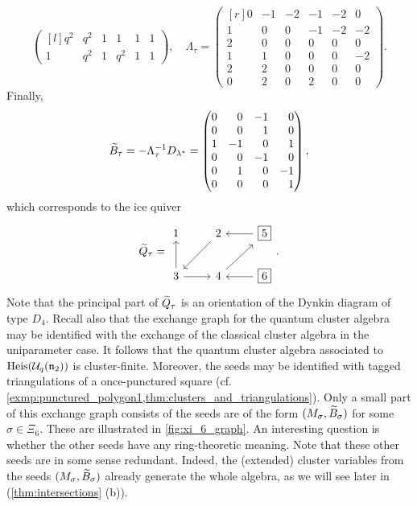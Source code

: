 \begin{example}
\begin{equation}
\begin{pmatrix*}[l]
			q^{2} & q^{2}    & 1        & 1        & 1        & 1        \\
			1     & q^{2}    & 1        & q^{2}    & 1        & 1
		\end{pmatrix*}
		,\quad
		\Lambda_\tau = \begin{pmatrix*}[r]
			0 & -1 & -2 & -1 & -2 & 0  \\
			1 & 0  & 0  & -1 & -2 & -2 \\
			2 & 0  & 0  & 0  & 0  & 0  \\
			1 & 1  & 0  & 0  & 0  & -2 \\
			2 & 2  & 0  & 0  & 0  & 0  \\
			0 & 2  & 0  & 2  & 0  & 0
		\end{pmatrix*}.
	\end{equation}
	Finally,
	\begin{align*}
		\tB_\tau = -\Lambda_\tau \inv D_{\lambda^*} = \begin{pmatrix*}[r]
			                                              0 & 0 & -1 & 0\\
			                                              0 & 0 & 1 & 0\\
			                                              1 & -1 & 0 & 1\\
			                                              0 & 0 & -1 & 0\\
			                                              0 & 1 & 0 & -1\\
			                                              0 & 0 & 0 & 1
		                                              \end{pmatrix*},
	\end{align*}
	which corresponds to the ice quiver
	\begin{equation*}
		\tQ_{\tau} =
		\begin{tikzcd}
			1 & 2 \dlar & \boxed{5} \lar \\
			3 \uar \rar & 4 \urar & \boxed{6} \lar
		\end{tikzcd}
		.
	\end{equation*}
	Note that the principal part of $\widetilde{Q}_\tau$ is an orientation of the Dynkin diagram of
	type $D_4$. Recall also that the exchange graph for the quantum cluster algebra may be
	identified with the exchange of the classical cluster algebra in the uniparameter case.
	It follows that the quantum cluster algebra associated to $\operatorname{Heis}(\mathcal{U}_q(\mathfrak{n}_2))$ is cluster-finite.
	Moreover, the seeds may be identified with tagged triangulations of a once-punctured
	square (cf. \cref{exmp:punctured_polygon1,thm:clusters_and_triangulations}). Only a
	small part of this exchange graph consists of the seeds are of the form $(M_\sigma,
		\widetilde{B}_\sigma)$ for some $\sigma \in \Xi_6$. These are illustrated in
	\cref{fig:xi_6_graph}. An interesting question is whether the other seeds have any
	ring-theoretic meaning. Note that these other seeds are in some sense redundant.
	Indeed, the (extended) cluster variables from the seeds $(M_\sigma, \widetilde{B}_\sigma)$
	already generate the whole algebra, as we will see later in (\cref{thm:intersections}
	(b)).


\end{example}
